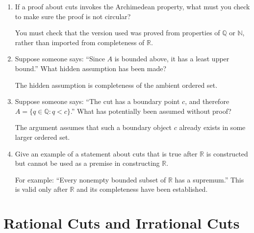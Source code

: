 \documentclass{self-check}
\begin{document}
\begin{enumerate}[label=\arabic{*}., itemsep=10pt]
    \begin{answer}
      One version is: for every \(x\in\mathbb{Q}\) there exists \(n\in\mathbb{N}\) such that
      \[ n>x. \]
    \end{answer}
  \item If a proof about cuts invokes the Archimedean property, what must you check to make sure the proof is not circular?

    \begin{answer}
      You must check that the version used was proved from properties of \(\mathbb{Q}\) or \(\mathbb{N}\), rather than imported from completeness of \(\mathbb{R}\).
    \end{answer}
  \item Suppose someone says: ``Since \(A\) is bounded above, it has a least upper bound.'' What hidden assumption has been made?

    \begin{answer}
      The hidden assumption is completeness of the ambient ordered set.
    \end{answer}
  \item Suppose someone says: ``The cut has a boundary point \(c\), and therefore \(A=\{q\in\mathbb{Q}:q<c\}\).'' What has potentially been assumed without proof?

    \begin{answer}
      The argument assumes that such a boundary object \(c\) already exists in some larger ordered set.
    \end{answer}
  \item Give an example of a statement about cuts that is true after \(\mathbb{R}\) is constructed but cannot be used as a premise in constructing \(\mathbb{R}\).

    \begin{answer}
      For example: ``Every nonempty bounded subset of \(\mathbb{R}\) has a supremum.'' This is valid only after \(\mathbb{R}\) and its completeness have been established.
    \end{answer}
\end{enumerate}

\section{Rational Cuts and Irrational Cuts}
\end{document}
